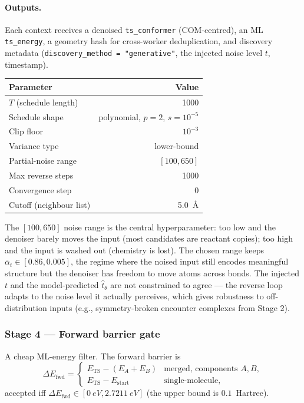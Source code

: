 \paragraph{Outputs.}
Each context receives a denoised \texttt{ts\_conformer} (COM-centred), an ML \texttt{ts\_energy}, a geometry hash for cross-worker deduplication, and discovery metadata (\texttt{discovery\_method = "generative"}, the injected noise level $t$, timestamp).

\noindent\begin{tabular}{lr}
\toprule
Parameter & Value \\
\midrule
$T$ (schedule length) & 1000 \\
Schedule shape & polynomial, $p=2$, $s = 10^{-5}$ \\
Clip floor & $10^{-3}$ \\
Variance type & lower-bound \\
Partial-noise range & $[100, 650]$ \\
Max reverse steps & 1000 \\
Convergence step & 0 \\
Cutoff (neighbour list) & \SI{5.0}{\angstrom} \\
\bottomrule
\end{tabular}

The $[100, 650]$ noise range is the central hyperparameter: too low and the denoiser barely moves the input (most candidates are reactant copies); too high and the input is washed out (chemistry is lost). The chosen range keeps $\bar{\alpha}_t \in [0.86, 0.005]$, the regime where the noised input still encodes meaningful structure but the denoiser has freedom to move atoms across bonds. The injected $t$ and the model-predicted $\hat{t}_\theta$ are not constrained to agree --- the reverse loop adapts to the noise level it actually perceives, which gives robustness to off-distribution inputs (e.g., symmetry-broken encounter complexes from Stage 2).


\subsubsection{Stage 4 --- Forward barrier gate}
\label{sec:fwd-barrier}

A cheap ML-energy filter. The forward barrier is
\begin{equation}
    \Delta E_\text{fwd} =
    \begin{cases}
        E_\text{TS} - (E_A + E_B) & \text{merged, components } A,B,\\
        E_\text{TS} - E_\text{start}  & \text{single-molecule,}
    \end{cases}
\end{equation}
accepted iff $\Delta E_\text{fwd} \in [\SI{0}{eV}, \SI{2.7211}{eV}]$ (the upper bound is $0.1$~Hartree).

